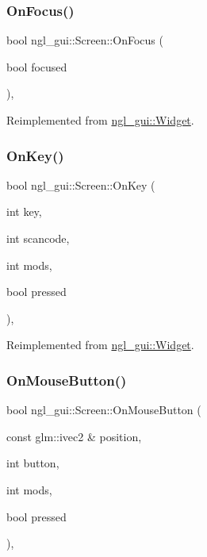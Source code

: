 \subsubsection{\texorpdfstring{On\+Focus()}{OnFocus()}}
{\footnotesize\ttfamily bool ngl\+\_\+gui\+::\+Screen\+::\+On\+Focus (\begin{DoxyParamCaption}\item[{bool}]{focused }\end{DoxyParamCaption})\hspace{0.3cm}{\ttfamily [override]}, {\ttfamily [virtual]}}



Reimplemented from \mbox{\hyperlink{classngl__gui_1_1_widget_a3ea889d10cb2e1d0241dabbefdce5dc7}{ngl\+\_\+gui\+::\+Widget}}.

\mbox{\label{classngl__gui_1_1_screen_a2f5b915a62f13cbac4d3b838f355c6c7}} 
\subsubsection{\texorpdfstring{On\+Key()}{OnKey()}}
{\footnotesize\ttfamily bool ngl\+\_\+gui\+::\+Screen\+::\+On\+Key (\begin{DoxyParamCaption}\item[{int}]{key,  }\item[{int}]{scancode,  }\item[{int}]{mods,  }\item[{bool}]{pressed }\end{DoxyParamCaption})\hspace{0.3cm}{\ttfamily [override]}, {\ttfamily [virtual]}}



Reimplemented from \mbox{\hyperlink{classngl__gui_1_1_widget_a5e2315b912f87414def29b4bdbba9205}{ngl\+\_\+gui\+::\+Widget}}.

\mbox{\label{classngl__gui_1_1_screen_ad0caca6d76fd28cde657bdf2ee25f8dc}} 
\subsubsection{\texorpdfstring{On\+Mouse\+Button()}{OnMouseButton()}}
{\footnotesize\ttfamily bool ngl\+\_\+gui\+::\+Screen\+::\+On\+Mouse\+Button (\begin{DoxyParamCaption}\item[{const glm\+::ivec2 \&}]{position,  }\item[{int}]{button,  }\item[{int}]{mods,  }\item[{bool}]{pressed }\end{DoxyParamCaption})\hspace{0.3cm}{\ttfamily [override]}, {\ttfamily [virtual]}}



